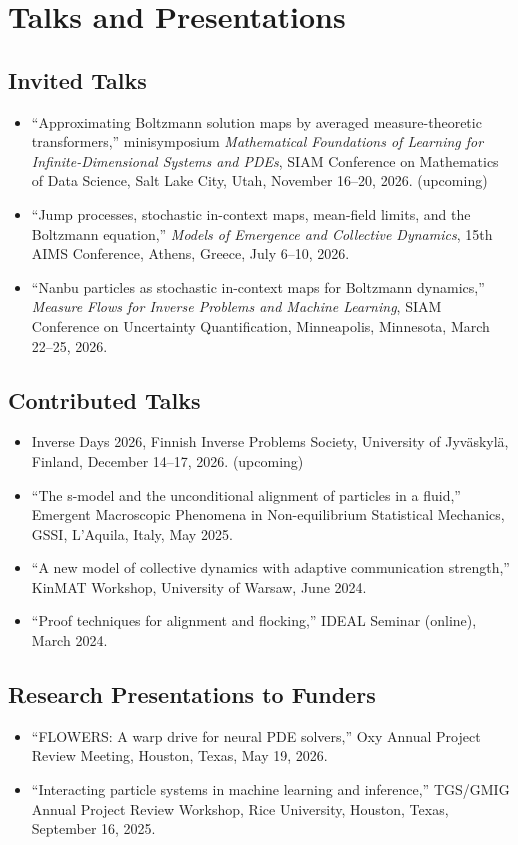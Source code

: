 \documentclass[10pt]{article}
\begin{document}
\newpage
\section*{Talks and Presentations}
\subsection*{Invited Talks}
\begin{itemize}
  \item ``Approximating Boltzmann solution maps by averaged measure-theoretic transformers,'' minisymposium \emph{Mathematical Foundations of Learning for Infinite-Dimensional Systems and PDEs}, SIAM Conference on Mathematics of Data Science, Salt Lake City, Utah, November 16--20, 2026. (upcoming)
  \item ``Jump processes, stochastic in-context maps, mean-field limits, and the Boltzmann equation,'' \emph{Models of Emergence and Collective Dynamics}, 15th AIMS Conference, Athens, Greece, July 6--10, 2026.
  \item ``Nanbu particles as stochastic in-context maps for Boltzmann dynamics,'' \emph{Measure Flows for Inverse Problems and Machine Learning}, SIAM Conference on Uncertainty Quantification, Minneapolis, Minnesota, March 22--25, 2026.
\end{itemize}

\subsection*{Contributed Talks}
\begin{itemize}
  \item Inverse Days 2026, Finnish Inverse Problems Society, University of Jyv\"askyl\"a, Finland, December 14--17, 2026. (upcoming)
  \item ``The s-model and the unconditional alignment of particles in a fluid,'' Emergent Macroscopic Phenomena in Non-equilibrium Statistical Mechanics, GSSI, L'Aquila, Italy, May 2025.
  \item ``A new model of collective dynamics with adaptive communication strength,'' KinMAT Workshop, University of Warsaw, June 2024.
  \item ``Proof techniques for alignment and flocking,'' IDEAL Seminar (online), March 2024.
\end{itemize}

\subsection*{Research Presentations to Funders}
\begin{itemize}
  \item ``FLOWERS: A warp drive for neural PDE solvers,'' Oxy Annual Project Review Meeting, Houston, Texas, May 19, 2026.
  \item ``Interacting particle systems in machine learning and inference,'' TGS/GMIG Annual Project Review Workshop, Rice University, Houston, Texas, September 16, 2025.
\end{itemize}
\end{document}
